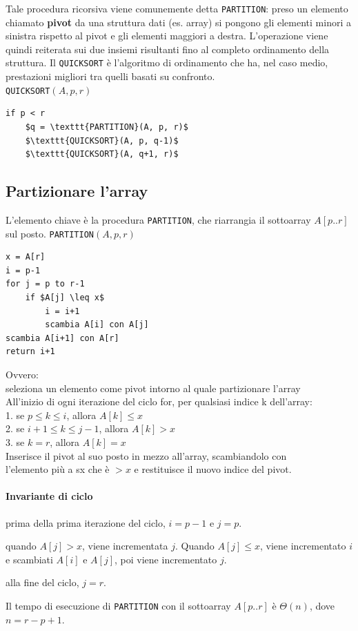 \documentclass[11pt,a4paper]{article}
\begin{document}
Tale procedura ricorsiva viene comunemente detta \texttt{PARTITION}: preso un
elemento chiamato \textbf{pivot} da una struttura dati (es. array) si pongono gli
elementi minori a sinistra rispetto al pivot e gli elementi maggiori a destra.
L'operazione viene quindi reiterata sui due insiemi risultanti fino al
completo ordinamento della struttura.
Il \texttt{QUICKSORT} è l'algoritmo di ordinamento che ha, nel caso medio,
prestazioni migliori tra quelli basati su confronto.\medskip\\
\texttt{QUICKSORT}$(A, p, r)$
\begin{lstlisting}[mathescape=true]
if p < r
    $q = \texttt{PARTITION}(A, p, r)$
    $\texttt{QUICKSORT}(A, p, q-1)$
    $\texttt{QUICKSORT}(A, q+1, r)$
\end{lstlisting}

\subsection{Partizionare l’array}
L’elemento chiave è la procedura \texttt{PARTITION}, che riarrangia il sottoarray $A[p..r]$ sul posto.
\texttt{PARTITION}$(A, p, r)$
\begin{lstlisting}[mathescape=true]
x = A[r]
i = p-1
for j = p to r-1
    if $A[j] \leq x$
        i = i+1
        scambia A[i] con A[j]
scambia A[i+1] con A[r]
return i+1
\end{lstlisting}
\medskip
Ovvero:\\
seleziona un elemento come pivot intorno al quale partizionare l’array\\
All’inizio di ogni iterazione del ciclo for, per qualsiasi indice k dell’array:\\
1. se $p \leq k \leq i$, allora $A[k] \leq x$\\
2. se $i+1 \leq k \leq j-1$, allora $A[k] > x$\\
3. se $k = r$, allora $A[k] = x$\\
Inserisce il pivot al suo posto in mezzo all’array, scambiandolo con\\
l’elemento più a sx che è $> x$ e restituisce il nuovo indice del pivot.

\paragraph{Invariante di ciclo}
\begin{description}[leftmargin=*, noitemsep]
  \item[inizializzazione] prima della prima iterazione del ciclo, $i = p-1$ e $j = p$.
  \item[conservazione] quando $A[j] > x$, viene incrementata $j$. Quando $A[j] \leq x$, viene incrementato $i$ e scambiati $A[i]$ e
$A[j]$, poi viene incrementato $j$.
  \item[conclusione] alla fine del ciclo, $j = r$.
\end{description}
%
Il tempo di esecuzione di \texttt{PARTITION} con il sottoarray $A[p..r]$ è $\Theta(n)$, dove $n = r-p+1$.
\end{document}
